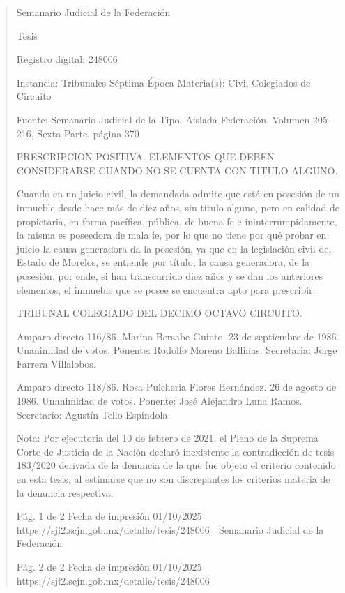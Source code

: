 \documentclass[11pt,a4paper]{article}
\begin{document}
\begin{quote}
                                                   Semanario Judicial de la Federación

                                                  Tesis

 Registro digital: 248006

 Instancia: Tribunales            Séptima Época                         Materia(s): Civil
 Colegiados de Circuito

                                  Fuente: Semanario Judicial de la      Tipo: Aislada
                                  Federación.
                                  Volumen 205-216, Sexta Parte,
                                  página 370


PRESCRIPCION POSITIVA. ELEMENTOS QUE DEBEN CONSIDERARSE CUANDO NO SE
CUENTA CON TITULO ALGUNO.


Cuando en un juicio civil, la demandada admite que está en posesión de un inmueble desde hace
más de diez años, sin título alguno, pero en calidad de propietaria, en forma pacífica, pública, de
buena fe e ininterrumpidamente, la misma es poseedora de mala fe, por lo que no tiene por qué
probar en juicio la causa generadora da la posesión, ya que en la legislación civil del Estado de
Morelos, se entiende por título, la causa generadora, de la posesión, por ende, si han transcurrido
diez años y se dan los anteriores elementos, el inmueble que se posee se encuentra apto para
prescribir.

TRIBUNAL COLEGIADO DEL DECIMO OCTAVO CIRCUITO.


Amparo directo 116/86. Marina Bersabe Guinto. 23 de septiembre de 1986. Unanimidad de votos.
Ponente: Rodolfo Moreno Ballinas. Secretaria: Jorge Farrera Villalobos.

Amparo directo 118/86. Rosa Pulcheria Flores Hernández. 26 de agosto de 1986. Unanimidad de
votos. Ponente: José Alejandro Luna Ramos. Secretario: Agustín Tello Espíndola.

Nota: Por ejecutoria del 10 de febrero de 2021, el Pleno de la Suprema Corte de Justicia de la
Nación declaró inexistente la contradicción de tesis 183/2020 derivada de la denuncia de la que fue
objeto el criterio contenido en esta tesis, al estimarse que no son discrepantes los criterios materia
de la denuncia respectiva.




                                             Pág. 1 de 2             Fecha de impresión 01/10/2025
  https://sjf2.scjn.gob.mx/detalle/tesis/248006
                                                Semanario Judicial de la Federación




                                           Pág. 2 de 2       Fecha de impresión 01/10/2025
https://sjf2.scjn.gob.mx/detalle/tesis/248006

\end{quote}
\end{document}
